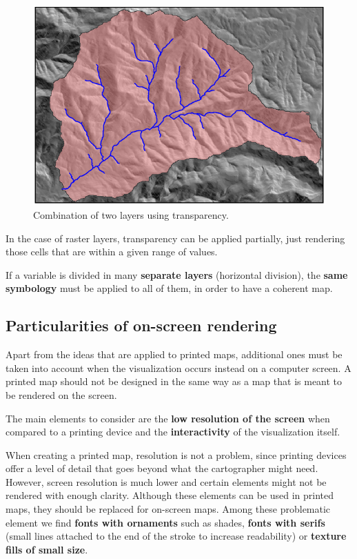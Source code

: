 \begin{figure}[!hbt]
\centering
\includegraphics[width=.7\columnwidth]{Visualization/Transparency.png}
\caption{\small Combination of two layers using transparency.}
\label{Fig:Transparency} 
\end{figure}

In the case of raster layers, transparency can be applied partially, just rendering those cells that are within a given range of values.

If a variable is divided in many \textbf{separate layers} (horizontal division), the \textbf{same symbology} must be applied to all of them, in order to have a coherent map.


\subsection{Particularities of on-screen rendering}

Apart from the ideas that are applied to printed maps, additional ones must be taken into account when the visualization occurs instead on a computer screen. A printed map should not be designed in the same way as a map that is meant to be rendered on the screen.

The main elements to consider are the \textbf{low resolution of the screen} when compared to a printing device and the \textbf{interactivity} of the visualization itself.

When creating a printed map, resolution is not a problem, since printing devices offer a level of detail that goes beyond what the cartographer might need. However, screen resolution is much lower and certain elements might not be rendered with enough clarity. Although these elements can be used in printed maps, they should be replaced for on-screen maps. Among these problematic element we find \textbf{fonts with ornaments} such as shades, \textbf{fonts with serifs} (small lines attached to the end of the stroke to increase readability) or \textbf{texture fills of small size}.

